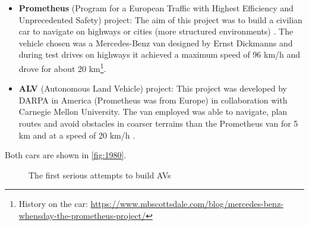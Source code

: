 \begin{itemize}

  \item \textbf{Prometheus} (Program for a European Traffic with Highest Efficiency and Unprecedented Safety) project: The aim of this project was to build a civilian car to navigate on highways or cities (\ie more structured environments) . The vehicle chosen was a Mercedes-Benz van designed by Ernst Dickmanns and during test drives on highways it achieved a maximum speed of 96 km/h and drove for about 20 km\footnote{History on the car: \url{https://www.mbscottsdale.com/blog/mercedes-benz-whensday-the-prometheus-project/}}.

  \item \textbf{ALV} (Autonomous Land Vehicle) project: This project was developed by DARPA in America (Prometheus was from Europe) in collaboration with Carnegie Mellon University. The van employed was able to navigate, plan routes and avoid obstacles in coarser terrains than the Prometheus van for 5 km and at a speed of 20 km/h . 
\end{itemize}

Both cars are shown in \autoref{fig:1980}.

\begin{figure}[htb]
  \centering
   \quad
  \caption{The first serious attempts to build AVs}
  \label{fig:1980}
\end{figure}

